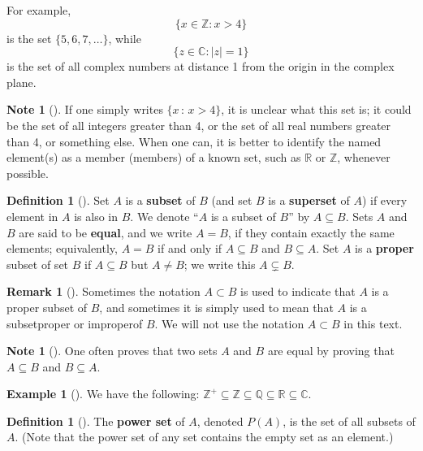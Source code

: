 \documentclass[10pt,]{book}
\newcommand{\terminology}[1]{\textbf{#1}}
\theoremstyle{plain}
\theoremstyle{definition}
\newtheorem{definition}[theorem]{Definition}
\theoremstyle{definition}
\newtheorem{remark}[theorem]{Remark}
\newtheorem{note}[theorem]{Note}
\theoremstyle{definition}
\newtheorem{example}[theorem]{Example}
\theoremstyle{definition}
\numberwithin{equation}{section}
\def\Z{\mathbb{Z}}
\def\R{\mathbb{R}}
\def\Q{\mathbb{Q}}
\def\C{\mathbb{C}}
\begin{document}
 For example,%
\begin{equation*}
\{x\in \Z : x > 4\}
\end{equation*}
is the set \(\{5, 6, 7, \ldots\}\), while%
\begin{equation*}
\{z\in \C : |z|=1\}
\end{equation*}
is the set of all complex numbers at distance 1 from the origin in the complex plane.%
\begin{note}[]\label{note-2}
If one simply writes \(\{x\,:\,x>4\}\), it is unclear what this set is; it could be the set of all integers greater than 4, or the set of all real numbers greater than 4, or something else. When one can, it is better to identify the named element(s) as a member (members) of a known set, such as \(\R\) or \(\Z\), whenever possible.%
\end{note}
\begin{definition}[{}]\label{definition-4}
Set \(A\) is a \terminology{subset} of \(B\) (and set \(B\) is a \terminology{superset} of \(A\)) if every element in \(A\) is also in \(B\). We denote ``\(A\) is a subset of \(B\)'' by \(A\subseteq B\). Sets \(A\) and \(B\) are said to be \terminology{equal}, and we write \(A=B\), if they contain exactly the same elements; equivalently, \(A=B\) if and only if \(A \subseteq B\) and \(B\subseteq A\). Set \(A\) is a \terminology{proper} subset of set \(B\) if \(A\subseteq B\) but \(A\neq B\); we write this \(A\subsetneq B\).%
\label{notation-14}
\label{notation-15}
\end{definition}
\begin{remark}[]\label{remark-1}
Sometimes the notation \(A\subset B\) is  used to indicate that \(A\) is a proper subset of \(B\), and sometimes it is simply used to mean that \(A\) is a subset\textemdash{}proper or improper\textemdash{}of \(B\). We will not use the notation \(A \subset B\) in this text.%
\end{remark}
\begin{note}[]\label{note-3}
One often proves that two sets \(A\) and \(B\) are equal by proving that \(A\subseteq B\) and \(B\subseteq A\).%
\end{note}
\begin{example}[]\label{example-2}
We have the following: \(\Z^+ \subseteq \Z \subseteq \Q \subseteq \R \subseteq \C\).%
\end{example}
\begin{definition}[{}]\label{definition-5}
The \terminology{power set} of \(A\), denoted \(P(A)\), is the set of all subsets of \(A\). (Note that the power set of any set contains the empty set as an element.)%
\label{notation-16}
\end{definition}
\end{document}
